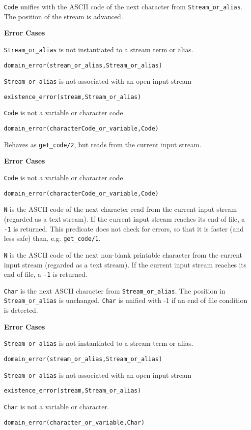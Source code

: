 \begin{description}
   {\tt Code} unifies with the ASCII code of the next character from
   {\tt Stream\_or\_alias}.  The position of the stream is advanced.

{\bf Error Cases}
\bi
\item 	{\tt Stream\_or\_alias} is not instantiated to a stream term or alias.
\bi
\item 	{\tt domain\_error(stream\_or\_alias,Stream\_or\_alias)}
\ei
\item 	{\tt Stream\_or\_alias} is not associated with an open input stream
\bi
\item 	{\tt existence\_error(stream,Stream\_or\_alias)}
\ei
\item 	{\tt Code} is not a variable or character code
\bi
\item 	{\tt domain\_error(characterCode\_or\_variable,Code)}
\ei
\ei

Behaves as {\tt get\_code/2}, but reads from the current input stream.

{\bf Error Cases}
\bi
\item 	{\tt Code} is not a variable or character code
\bi
\item 	{\tt domain\_error(characterCode\_or\_variable,Code)}
\ei
\ei

    {\tt N} is the ASCII code of the next character read from the
    current input stream (regarded as a text stream). If the current
    input stream reaches its end of file, a {\tt -1} is returned.
    This predicate does not check for errors, so that it is faster
    (and less safe) than, e.g. {\tt get\_code/1}.

    {\tt N} is the ASCII code of the next non-blank printable
    character from the current input stream (regarded as a text
    stream).  If the current input stream reaches its end of file, a
    {\tt -1} is returned.


{\tt Char} is the next ASCII character from {\tt Stream\_or\_alias}.
The position in {\tt Stream\_or\_alias} is unchanged.  {\tt Char} is
unified with -1 if an end of file condition is detected.

{\bf Error Cases}
\bi
\item 	{\tt Stream\_or\_alias} is not instantiated to a stream term or alias.
\bi
\item 	{\tt domain\_error(stream\_or\_alias,Stream\_or\_alias)}
\ei
\item 	{\tt Stream\_or\_alias} is not associated with an open input stream
\bi
\item 	{\tt existence\_error(stream,Stream\_or\_alias)}
\ei
\item 	{\tt Char} is not a variable or character.
\bi
\item 	{\tt domain\_error(character\_or\_variable,Char)}
\ei
\ei


\end{description}
